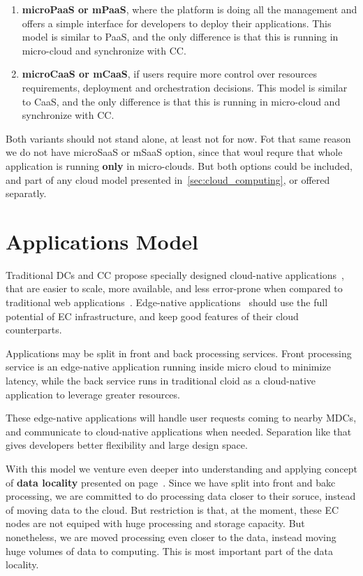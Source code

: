 \begin{enumerate}[start=1,label={(\bfseries \arabic*)}]
	\item \textbf{microPaaS or mPaaS}, where the platform is doing all the management and offers a simple interface for developers to deploy their applications. This model is similar to PaaS, and the only difference is that this is running in micro-cloud and synchronize with CC.
	\item \textbf{microCaaS or mCaaS}, if users require more control over resources requirements, deployment and orchestration decisions. This model is similar to CaaS, and the only difference is that this is running in micro-cloud and synchronize with CC.
\end{enumerate}

Both variants should not stand alone, at least not for now. Fot that same reason we do not have microSaaS or mSaaS option, since that woul requre that whole application is running \textbf{only} in micro-clouds. But both options could be included, and part of any cloud model presented in~\ref{sec:cloud_computing}, or offered separatly.
%
%
\section{Applications Model}\label{sec:application_model}
%
Traditional DCs and CC propose specially designed cloud-native applications~\cite{GannonBS17}, that are easier to scale, more available, and less error-prone when compared to traditional web applications~\cite{GannonBS17}. Edge-native applications~\cite{SatyanarayananK19} should use the full potential of EC infrastructure, and keep good features of their cloud counterparts. 

Applications may be split in front and back processing services. Front processing service is an edge-native application running inside micro cloud to minimize latency, while the back service runs in traditional cloid as a cloud-native application to leverage greater resources. 

These edge-native applications will handle user requests coming to nearby MDCs, and communicate to cloud-native applications when needed. Separation like that gives developers better flexibility and large design space. 

With this model we venture even deeper into understanding and applying concept of \textbf{data locality} presented on page~\pageref{ds:data_locality}. Since we have split into front and bakc processing, we are committed to do processing data closer to their soruce, instead of moving data to the cloud. But restriction is that, at the moment, these EC nodes are not equiped with huge processing and storage capacity. But nonetheless, we are moved processing even closer to the data, instead moving huge volumes of data to computing. This is most important part of the data locality.
%
%
